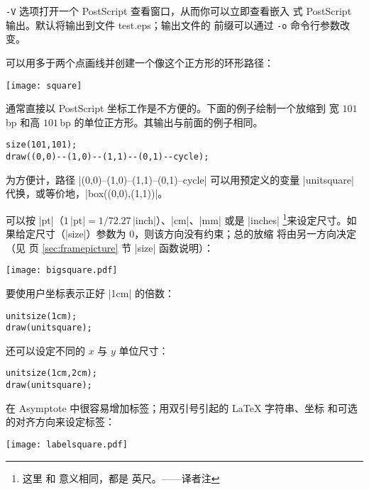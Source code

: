 \documentclass{ctexbook}
\newcommand*\prgname[1]{\textsf{#1}}
\newcommand\transnote[1]{\footnote{#1——译者注}}
\begin{document}
\verb=-V= 选项打开一个 \prgname{PostScript} 查看窗口，从而你可以立即查看嵌入
式 \prgname{PostScript} 输出。默认将输出到文件 \prgname{test.eps}；输出文件的
前缀可以通过 \verb=-o= 命令行参数改变。

可以用多于两个点画线并创建一个像这个正方形的环形路径：

\begin{center}
  \texttt{[image: square]}
\end{center}

通常直接以 \prgname{PostScript} 坐标工作是不方便的。下面的例子绘制一个放缩到
宽 $101$\,bp 和高 $101$\,bp 的单位正方形。其输出与前面的例子相同。
\begin{lstlisting}
size(101,101);
draw((0,0)--(1,0)--(1,1)--(0,1)--cycle);
\end{lstlisting}

为方便计，路径 |(0,0)--(1,0)--(1,1)--(0,1)--cycle| 可以用预定义的变量
|unitsquare| 代换，或等价地，|box((0,0),(1,1))|。

可以按 |pt|（$1$\,|pt|${}=1/72.27$\,|inch|）、|cm|、|mm| 或是 |inches|%
\transnote{这里  和  意义相同，都是
英尺。}来设定尺寸。如果给定尺寸（|size|）参数为 0，则该方向没有约束；总的放缩
将由另一方向决定（见 \pageref{sec:framepicture} 页 \ref{sec:framepicture} 节
|size| 函数说明）：

\begin{center}
  \texttt{[image: bigsquare.pdf]}
\end{center}

要使用户坐标表示正好 |1cm| 的倍数：
\begin{lstlisting}
unitsize(1cm);
draw(unitsquare);
\end{lstlisting}

还可以设定不同的 $x$ 与 $y$ 单位尺寸：
\begin{lstlisting}
unitsize(1cm,2cm);
draw(unitsquare);
\end{lstlisting}

在 \prgname{Asymptote} 中很容易增加标签；用双引号引起的 \LaTeX{} 字符串、坐标
和可选的对齐方向来设定标签：

\begin{center}
  \texttt{[image: labelsquare.pdf]}
\end{center}
\end{document}
